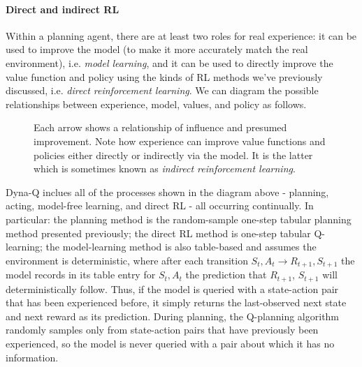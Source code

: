 \documentclass[12pt]{article}
\begin{document}
\paragraph{Direct and indirect RL} Within a planning agent, there are at least two roles for real experience: it can be used to improve the model (to make it more accurately match the real environment), i.e. \emph{model learning}, and it can be used to directly improve the value function and policy using the kinds of RL methods we've previously discussed, i.e. \emph{direct reinforcement learning}. We can diagram the possible relationships between experience, model, values, and policy as follows.
\begin{figure}[h]
  \centering
\caption{\footnotesize Each arrow shows a relationship of influence and presumed improvement. Note how experience can improve value functions and policies either directly or indirectly via the model. It is the latter which is sometimes known as \emph{indirect reinforcement learning}.}
\end{figure}

Dyna-Q inclues all of the processes shown in the diagram above - planning, acting, model-free learning, and direct RL - all occurring continually. In particular: the planning method is the random-sample one-step tabular planning method presented previously; the direct RL method is one-step tabular Q-learning; the model-learning method is also table-based and assumes the environment is deterministic, where after each transition $S_t, A_t \longrightarrow R_{t+1}, S_{t+1}$ the model records in its table entry for $S_t, A_t$ the prediction that $R_{t+1}$, $S_{t+1}$ will deterministically follow. Thus, if the model is queried with a state-action pair that has been experienced before, it simply returns the last-observed next state and next reward as its prediction. During planning, the Q-planning algorithm randomly samples only from state-action pairs that have previously been experienced, so the model is never queried with a pair about which it has no information.
\end{document}

